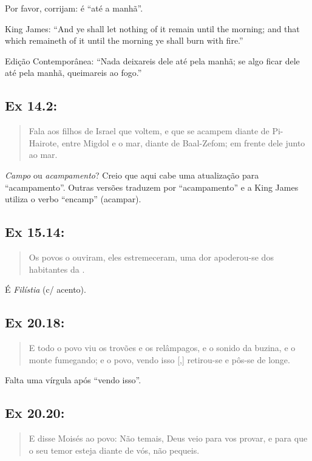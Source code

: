 Por favor, corrijam: é ``até a manhã''.

King James: ``And ye shall let nothing of it remain until the morning; and that which remaineth of it until the morning ye shall burn with fire.''

Edição Contemporânea: ``Nada deixareis dele até pela manhã; se algo ficar dele até pela manhã, queimareis ao fogo.''

\subsection*{Ex 14.2:} 
\begin{quote}
    \small
Fala aos filhos de Israel que voltem, e que se acampem diante de Pi-Hairote, entre Migdol e o mar, diante de Baal-Zefom; em frente dele  junto ao mar.
\end{quote}

\emph{Campo} ou \emph{acampamento}? Creio que aqui cabe uma atualização para ``acampamento''. Outras versões traduzem por ``acampamento'' e a King James utiliza o verbo ``encamp'' (acampar). 

\subsection*{Ex 15.14:} 
\begin{quote}
    \small
Os povos o ouviram, eles estremeceram, uma dor apoderou-se dos habitantes da .
\end{quote}

É \emph{Filístia} (c/ acento).

\subsection*{Ex 20.18:} 
\begin{quote}
    \small
E todo o povo viu os trovões e os relâmpagos, e o sonido da buzina, e o monte fumegando; e o povo, vendo isso [,] retirou-se e pôs-se de longe.
\end{quote}

Falta uma vírgula após ``vendo isso''.

\subsection*{Ex 20.20:} 
\begin{quote}
    \small
E disse Moisés ao povo: Não temais, Deus veio para vos provar, e para que o seu temor esteja diante de vós,  não pequeis.
\end{quote}

